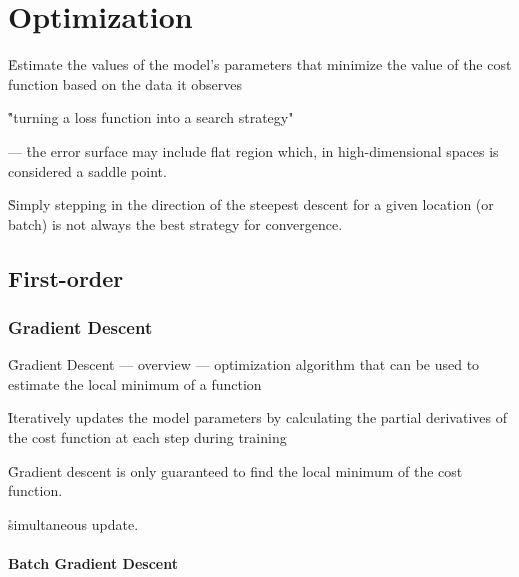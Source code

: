\section{Optimization}
\label{subsec:optimization}


\r{Estimate the values of the model's parameters that minimize the value of the cost function based on the data it observes}

\r{"turning a loss function into a search strategy"}


 --- \r{the error surface may include flat region which, in high-dimensional spaces is considered a saddle point.}

\r{Simply stepping in the direction of the steepest descent for a given location (or batch) is not always the best strategy for convergence. }

\subsection{First-order}

\subsubsection{Gradient Descent}

\r{Gradient Descent --- overview --- optimization algorithm that can be used to estimate the local minimum of a function}

\r{Iteratively updates the model parameters by calculating the partial derivatives of the cost function at each step during training}

\r{Gradient descent is only guaranteed to find the local minimum of the cost function.}

\r{simultaneous update.}




\paragraph{Batch Gradient Descent}

